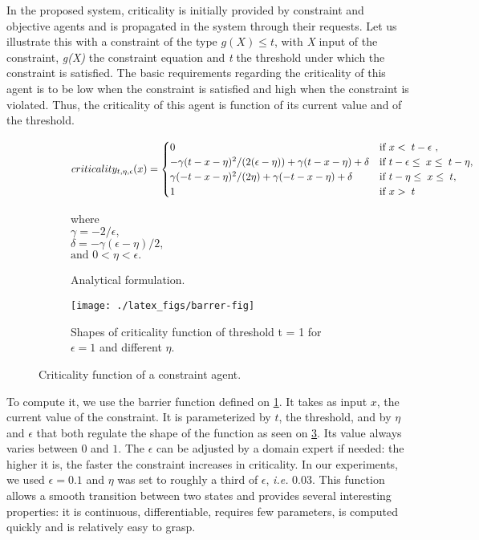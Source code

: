 In the proposed system, criticality is initially provided by constraint and objective agents and is propagated in the system through their requests.
Let us illustrate this with a constraint of the type \(g(X) \leq t\), with \emph{X} input of the constraint, \emph{g(X)} the constraint equation and \emph{t} the threshold under which the constraint is satisfied. The basic requirements regarding the criticality of this agent is to be low when the constraint is satisfied and high when the constraint is violated. Thus, the criticality of this agent is function of its current value and of the threshold.

\begin{figure}
	\centering
	\begin{subfigure}[b]{\textwidth}
	\centering
	\scriptsize
	
		\[criticality_{t,\eta,\epsilon}(x)=
			\begin{cases}
				0		&\text{if \( x < \; t - \epsilon \) },\\
				-\gamma ( t - x - \eta ) ^ 2 / ( 2 ( \epsilon - \eta)) + \gamma ( t - x - \eta ) + \delta &\text{if \(t - \epsilon \leq \;x \leq \;t - \eta \)},\\
				\gamma (-t-x-\eta)^2/(2 \eta)+\gamma (-t-x-\eta) + \delta &\text{if \(t - \eta \leq \;x \leq \;t\)},\\
				1	&\text{if \( x > \; t \)}
			\end{cases}\]

		where\\
		$\gamma = -2/ \epsilon,$\\
		$\delta = -\gamma (\epsilon - \eta )/2,$\\
		$\text{and } 0 < \eta < \epsilon.$
	\caption{Analytical formulation.}\label{crit_func}
	\end{subfigure}
	
	\begin{subfigure}[b]{\textwidth}
		\centering
		\texttt{[image: ./latex\_figs/barrer-fig]}
		\caption{Shapes of criticality function of threshold t = 1 for \(\epsilon=1\) and different \(\eta\).}\label{crit_shapes}
	\end{subfigure}
	
\caption{Criticality function of a constraint agent.}
\end{figure}

To compute it, we use the barrier function defined on \figurename{} \ref{crit_func}. It takes as input \(x\), the current value of the constraint. It is parameterized by \(t\), the threshold, and by \(\eta\) and \(\epsilon\) that both regulate the shape of the function as seen on \figurename{} \ref{crit_shapes}. Its value always varies between \(0\) and \(1\).
The \(\epsilon\) can be adjusted by a domain expert if needed: the higher it is, the faster the constraint increases in criticality.
In our experiments, we used $\epsilon = 0.1$ and $\eta$ was set to roughly a third of $\epsilon$, \textit{i.e.} 0.03.
This function allows a smooth transition between two states and provides several interesting properties: it is continuous, differentiable, requires few parameters, is computed quickly and is relatively easy to grasp.

